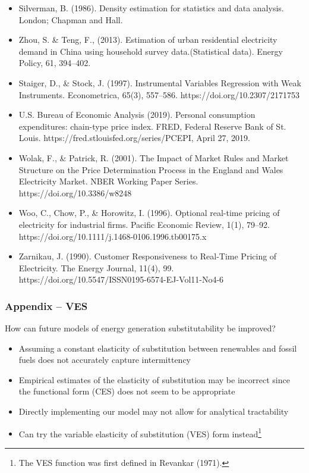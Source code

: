 \documentclass[aspectratio=169]{beamer}
\begin{document}
\begin{frame}[allowframebreaks]
\begin{itemize}
\item Silverman, B. (1986). Density estimation for statistics and data analysis. London; Chapman and Hall.

\item Zhou, S. \& Teng, F., (2013). Estimation of urban residential electricity demand in China using household survey data.(Statistical data). Energy Policy, 61, 394–402.

\item Staiger, D., \& Stock, J. (1997). Instrumental Variables Regression with Weak Instruments. Econometrica, 65(3), 557–586. https://doi.org/10.2307/2171753

\item U.S. Bureau of Economic Analysis (2019). Personal consumption expenditures: chain-type price index. FRED, Federal Reserve Bank of St. Louis. https://fred.stlouisfed.org/series/PCEPI, April 27, 2019.

\item Wolak, F., \& Patrick, R. (2001). The Impact of Market Rules and Market Structure on the Price Determination Process in the England and Wales Electricity Market. NBER Working Paper Series. https://doi.org/10.3386/w8248

\item Woo, C., Chow, P., \& Horowitz, I. (1996). Optional real-time pricing of electricity for industrial firms. Pacific Economic Review, 1(1), 79–92. https://doi.org/10.1111/j.1468-0106.1996.tb00175.x

\item Zarnikau, J. (1990). Customer Responsiveness to Real-Time Pricing of Electricity. The Energy Journal, 11(4), 99. https://doi.org/10.5547/ISSN0195-6574-EJ-Vol11-No4-6

\end{itemize}

\end{frame}


\begin{frame}
\frametitle{Appendix -- VES}

\begin{block}{How can future models of energy generation substitutability be improved?}
	\begin{itemize}
		\setlength\itemsep{0.5em}
		\item <1-> Assuming a constant elasticity of substitution between renewables and fossil fuels does not accurately capture intermittency
		\item <1-> Empirical estimates of the elasticity of substitution may be incorrect since the functional form (CES) does not seem to be appropriate 
		\item <1-> Directly implementing our model may not allow for analytical tractability
		\item <2-> Can try the variable elasticity of substitution (VES) form instead\footnote{The VES function was first defined in Revankar (1971).}
	\end{itemize}
\end{block}
\end{frame}
\end{document}
